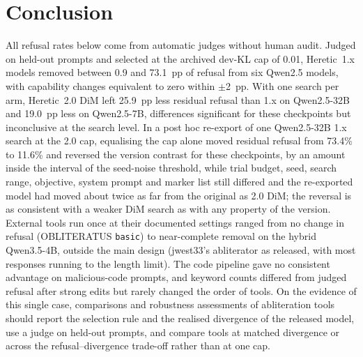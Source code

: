 \section{Conclusion}
\label{sec:conclusion}

All refusal rates below come from automatic judges without human audit. Judged on held-out prompts and selected at
the archived dev-KL cap of 0.01, Heretic~1.x models removed between 0.9
and 73.1~pp of refusal from six Qwen2.5 models, with capability changes equivalent to zero within $\pm$2~pp. With one
search per arm, Heretic~2.0 DiM left 25.9~pp less residual refusal than 1.x on Qwen2.5-32B and 19.0~pp less on
Qwen2.5-7B, differences significant for these checkpoints but inconclusive at the search level. In a post hoc
re-export of one Qwen2.5-32B 1.x search at the 2.0 cap, equalising the cap alone moved residual refusal from 73.4\% to
11.6\% and reversed the version contrast for these checkpoints, by an amount inside the interval of the seed-noise
threshold, while trial budget, seed, search range, objective, system prompt and marker list still differed and the re-exported model had moved about twice as far from the original as 2.0 DiM; the reversal is as
consistent with a weaker DiM search as with any property of the version. External tools run once at their documented
settings ranged from no change in refusal (OBLITERATUS \texttt{basic}) to near-complete removal on the hybrid
Qwen3.5-4B, outside the main design (jwest33's abliterator as released, with most responses running to the length
limit). The code pipeline gave no consistent advantage on malicious-code prompts, and keyword counts differed from
judged refusal after strong edits but rarely changed the order of tools. On the evidence of this single case,
comparisons and robustness assessments of abliteration tools should report the selection rule and the realised
divergence of the released model, use a judge on held-out prompts, and compare tools at matched divergence or across
the refusal--divergence trade-off rather than at one cap.
